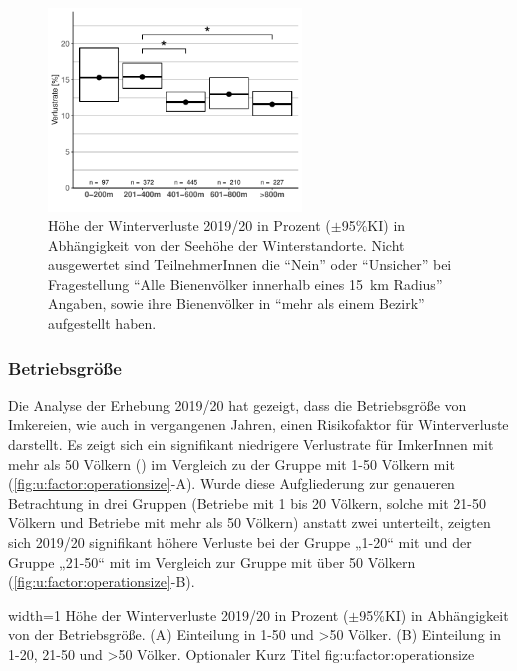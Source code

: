 \begin{figure}[H]
  \centering
  \includegraphics[keepaspectratio,width=0.6\textwidth]{project-U-wintersterblichkeit/figures/plot_elevation}
  \caption{Höhe der Winterverluste 2019/20 in Prozent ($\pm$95\%KI) in Abhängigkeit von der Seehöhe der Winterstandorte. Nicht ausgewertet sind TeilnehmerInnen die \enquote{Nein} oder \enquote{Unsicher} bei Fragestellung \enquote{Alle Bienenvölker innerhalb eines  \SI{15}{\kilo\meter} Radius} Angaben, sowie ihre Bienenvölker in \enquote{mehr als einem Bezirk} aufgestellt haben.}
  \label{fig:u:elevation}
\end{figure}

\subsubsection{Betriebsgröße}
\label{ss:betriebsgroesse:U}

Die Analyse der Erhebung 2019/20 hat gezeigt, dass die Betriebsgröße von Imkereien, wie auch in vergangenen Jahren, einen Risikofaktor für Winterverluste darstellt.
\newline
Es zeigt sich ein signifikant niedrigere Verlustrate für ImkerInnen mit mehr als 50 Völkern () im Vergleich zu der Gruppe mit 1-50 Völkern mit  (\cref{fig:u:factor:operationsize}-A). Wurde diese Aufgliederung zur genaueren Betrachtung in drei Gruppen (Betriebe mit 1 bis 20 Völkern, solche mit 21-50 Völkern und Betriebe mit mehr als 50 Völkern) anstatt zwei unterteilt, zeigten sich 2019/20 signifikant höhere Verluste bei der Gruppe „1-20`` mit  und der Gruppe „21-50`` mit  im Vergleich zur Gruppe mit über 50 Völkern (\cref{fig:u:factor:operationsize}-B).

  {width=1\textwidth} %
  {Höhe der Winterverluste 2019/20 in Prozent ($\pm$95\%KI) in Abhängigkeit von der Betriebsgröße. (A) Einteilung in 1-50 und >50 Völker. (B) Einteilung in 1-20, 21-50 und >50 Völker.} %
  {Optionaler Kurz Titel} %
  {fig:u:factor:operationsize} %

